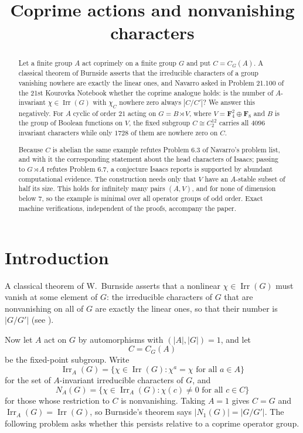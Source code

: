 \documentclass[11pt,a4paper,reqno]{amsart}
\title{Coprime actions and nonvanishing characters}
\date{}
\theoremstyle{definition}
\theoremstyle{remark}
\newcommand{\F}{\mathbf F}
\newcommand{\Irr}{\operatorname{Irr}}
\begin{document}
\begin{abstract}
Let a finite group $A$ act coprimely on a finite group $G$ and put
$C=C_G(A)$.  A classical theorem of Burnside asserts that the irreducible
characters of a group vanishing nowhere are exactly the linear ones,
and Navarro asked
in Problem 21.100 of the 21st Kourovka Notebook whether the coprime
analogue holds: is the number of $A$-invariant $\chi\in\Irr(G)$ with
$\chi_C$ nowhere zero always $|C/C'|$?  We answer this negatively.  For
$A$ cyclic of order $21$ acting on $G=B\rtimes V$, where
$V=\F_4^2\oplus\F_8$ and $B$ is the group of Boolean functions on $V$,
the fixed subgroup $C\cong C_2^{12}$ carries all $4096$ invariant
characters while only $1728$ of them are nowhere zero on $C$.

Because $C$ is abelian the same example refutes Problem 6.3 of Navarro's
problem list, and with it the corresponding statement about the head
characters of Isaacs; passing to $G\rtimes A$ refutes Problem 6.7, a
conjecture Isaacs reports is supported by abundant computational
evidence.  The construction needs only that $V$ have an $A$-stable
subset of half its size.  This holds for infinitely many pairs $(A,V)$,
and for none of dimension below $7$, so the example is minimal over all
operator groups of odd order.  Exact machine verifications, independent
of the proofs, accompany the paper.
\end{abstract}

\maketitle

\section{Introduction}

A classical theorem of W.~Burnside asserts that a nonlinear
$\chi\in\Irr(G)$ must vanish at some element of $G$: the irreducible
characters of $G$ that are nonvanishing on all of $G$ are exactly the
linear ones, so that their number is $|G/G'|$ (see
\cite[Theorem 3.15]{isaacs-book}).

Now let $A$ act on $G$ by automorphisms with $(|A|,|G|)=1$, and let
\[
 C=C_G(A)
\]
be the fixed-point subgroup.  Write
\[
 \Irr_A(G)=\{\chi\in\Irr(G):\chi^a=\chi\text{ for all }a\in A\}
\]
for the set of $A$-invariant irreducible characters of $G$, and
\[
 N_A(G)=\{\chi\in\Irr_A(G):\chi(c)\neq0\text{ for all }c\in C\}
\]
for those whose restriction to $C$ is nonvanishing.  Taking $A=1$ gives
$C=G$ and $\Irr_A(G)=\Irr(G)$, so Burnside's theorem says
$|N_1(G)|=|G/G'|$.  The following problem asks whether this persists
relative to a coprime operator group.
\end{document}
